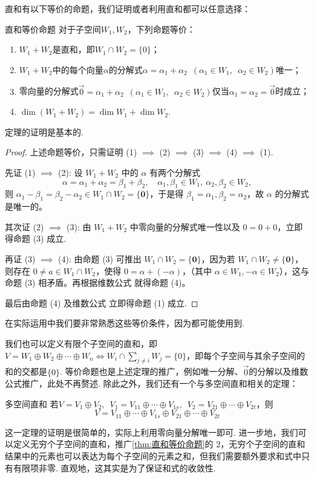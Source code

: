 直和有以下等价的命题，我们证明或者利用直和都可以任意选择：
\begin{theorem}{}{直和等价命题}
    对于子空间$W_1,W_2$，下列命题等价：
    \begin{enumerate}
        \item $W_1+W_2$是直和，即$W_1 \cap W_2=\{0\}$；

        \item $W_1+W_2$中的每个向量$\alpha$的分解式$\alpha=\alpha_1+\alpha_2\enspace(\alpha_1\in W_1,\enspace\alpha_2\in W_2)$唯一；

        \item 零向量的分解式$\vec{0}=\alpha_1+\alpha_2 \enspace(\alpha_1\in W_1,\enspace\alpha_2\in W_2)$仅当$\alpha_1=\alpha_2=\vec{0}$时成立；

        \item $\dim (W_1+W_2)=\dim W_1+\dim W_2$.
    \end{enumerate}
\end{theorem}

定理的证明是基本的.
\begin{proof}
    上述命题等价，只需证明 (1) $\implies$ (2) $\implies$ (3) $\implies$ (4) $\implies$ (1).

    先证 (1) $\implies$ (2): 设 $W_1 + W_2$ 中的 $\alpha$ 有两个分解式
    $$
    \alpha = \alpha_1 + \alpha_2 = \beta_1 + \beta_2, \quad \alpha_1, \beta_1 \in W_1, \ \alpha_2, \beta_2 \in W_2,
    $$
    则 $\alpha_1 - \beta_1 = \beta_2 - \alpha_2 \in W_1 \cap W_2 = \{\mathbf{0}\}$，于是得 $\beta_1 = \alpha_1, \beta_2 = \alpha_2$，故 $\alpha$ 的分解式是唯一的。

    其次证 (2) $\implies$ (3): 由 $W_1 + W_2$ 中零向量的分解式唯一性以及 $0 = 0 + 0$，立即得命题 (3) 成立.

    再证 (3) $\implies$ (4): 由命题 (3) 可推出 $W_1 \cap W_2 = \{\mathbf{0}\}$，因为若 $W_1 \cap W_2 \ne \{\mathbf{0}\}$，则存在 $0 \ne a \in W_1 \cap W_2$，使得 $0 = \alpha + (-\alpha)$，（其中 $\alpha \in W_1, -\alpha \in W_2$），这与命题 (3) 相矛盾。再根据维数公式 就得命题 (4)。

    最后由命题 (4) 及维数公式 立即得命题 (1) 成立.
\end{proof}
在实际运用中我们要非常熟悉这些等价条件，因为都可能使用到.

我们也可以定义有限个子空间的直和，即$V=W_1\oplus W_2\oplus\cdots\oplus W_n \iff W_i \cap \sum\limits_{j \neq i}W_j=\{0\}$，即每个子空间与其余子空间的和的交都是$\{0\}$. 等价命题也是上述定理的推广，例如唯一分解、$\vec{0}$的分解以及维数公式推广，此处不再赘述. 除此之外，我们还有一个与多空间直和相关的定理：
\begin{theorem}{}{多空间直和}
    若$V=V_1\oplus V_2,\enspace V_1=V_{11}\oplus\cdots\oplus V_{1s},\enspace V_2=V_{21}\oplus\cdots\oplus V_{2t}$，则
    \[V=V_{11}\oplus\cdots\oplus V_{1s}\oplus V_{21}\oplus\cdots\oplus V_{2t}\]
\end{theorem}
这一定理的证明是很简单的，实际上利用零向量分解唯一即可. 进一步地，我们可以定义无穷个子空间的直和，推广\autoref{thm:直和等价命题}的 $2$，无穷个子空间的直和结果中的元素也可以表达为每个子空间的元素之和，但我们需要额外要求和式中只有有限项非零. 直观地，这其实是为了保证和式的收敛性.

